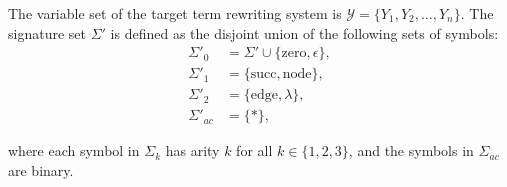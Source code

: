 \begin{definition}
    The variable set of the target term rewriting system is \(\mathcal{Y} \mathop{=} \{ Y_1, Y_2, \ldots, Y_n \}\). The signature set $\Sigma'$ is defined as the disjoint union of the following sets of symbols:
    \begin{align*}
        \Sigma'_0 &= \Sigma' \mathop{\cup} \{ \text{zero}, \epsilon \}, \\ 
        \Sigma'_1 &= \{\text{succ}, \text{node}\}, \\
        \Sigma'_2 &= \{ \text{edge}, \lambda\}, \\
        \Sigma'_{ac} &= \{ * \},
    \end{align*}
    
    where each symbol in \(\Sigma_k\) has arity \(k\) for all \(k \mathop{\in} \{1,2,3\}\), and the symbols in \(\Sigma_{ac}\) are binary.
    \end{definition}
